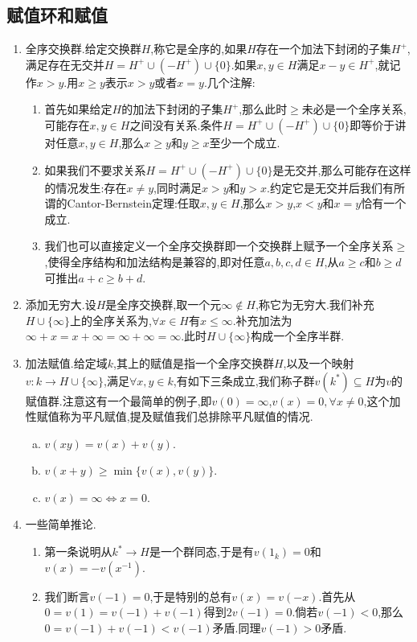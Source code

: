 \subsection{赋值环和赋值}
\begin{enumerate}
	\item 全序交换群.给定交换群$H$,称它是全序的,如果$H$存在一个加法下封闭的子集$H^+$,满足存在无交并$H=H^+\cup(-H^+)\cup\{0\}$.如果$x,y\in H$满足$x-y\in H^+$,就记作$x>y$.用$x\ge y$表示$x>y$或者$x=y$.几个注解:
	\begin{enumerate}[(1)]
		\item 首先如果给定$H$的加法下封闭的子集$H^+$,那么此时$\ge$未必是一个全序关系,可能存在$x,y\in H$之间没有关系.条件$H=H^+\cup(-H^+)\cup\{0\}$即等价于讲对任意$x,y\in H$,那么$x\ge y$和$y\ge x$至少一个成立.
		\item 如果我们不要求关系$H=H^+\cup(-H^+)\cup\{0\}$是无交并,那么可能存在这样的情况发生:存在$x\not=y$,同时满足$x>y$和$y>x$.约定它是无交并后我们有所谓的Cantor-Bernstein定理:任取$x,y\in H$,那么$x>y$,$x<y$和$x=y$恰有一个成立.
		\item 我们也可以直接定义一个全序交换群即一个交换群上赋予一个全序关系$\ge$,使得全序结构和加法结构是兼容的,即对任意$a,b,c,d\in H$,从$a\ge c$和$b\ge d$可推出$a+c\ge b+d$.
	\end{enumerate}
	\item 添加无穷大.设$H$是全序交换群,取一个元$\infty\not\in H$,称它为无穷大.我们补充$H\cup\{\infty\}$上的全序关系为,$\forall x\in H$有$x\le\infty$.补充加法为$\infty+x=x+\infty=\infty+\infty=\infty$.此时$H\cup\{\infty\}$构成一个全序半群.
	\item 加法赋值.给定域$k$,其上的赋值是指一个全序交换群$H$,以及一个映射$v:k\to H\cup\{\infty\}$,满足$\forall x,y\in k$,有如下三条成立,我们称子群$v(k^*)\subseteq H$为$v$的赋值群.注意这有一个最简单的例子,即$v(0)=\infty$,$v(x)=0,\forall x\not=0$,这个加性赋值称为平凡赋值,提及赋值我们总排除平凡赋值的情况.
	\begin{enumerate}[(a)]
		\item $v(xy)=v(x)+v(y)$.
		\item $v(x+y)\ge\min\{v(x),v(y)\}$.
		\item $v(x)=\infty\Leftrightarrow x=0$.
	\end{enumerate}
	\item 一些简单推论.
	\begin{enumerate}[(1)]
		\item 第一条说明从$k^*\to H$是一个群同态,于是有$v(1_k)=0$和$v(x)=-v(x^{-1})$.
		\item 我们断言$v(-1)=0$,于是特别的总有$v(x)=v(-x)$.首先从$0=v(1)=v(-1)+v(-1)$得到$2v(-1)=0$.倘若$v(-1)<0$,那么$0=v(-1)+v(-1)<v(-1)$矛盾.同理$v(-1)>0$矛盾.

\end{enumerate}
\end{enumerate}
